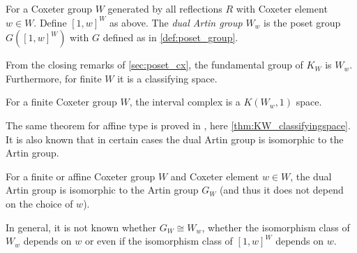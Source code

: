 \documentclass[class=article, crop=false]{standalone}
\begin{document}
\begin{definition}
    For a Coxeter group $W$ generated by all reflections $R$ with Coxeter element $w \in W$. Define $[1,w]^W$ as above. The \emph{dual Artin group} $W_w$ is the poset group $G([1,w]^W)$ with $G$ defined as in \cref{def:poset_group}.
\end{definition}

From the closing remarks of \cref{sec:poset_cx}, the fundamental group of $K_{W}$ is $W_w$. Furthermore, for finite $W$ it is a classifying space.

\begin{theorem}
    For a finite Coxeter group $W$, the interval complex is a $K(W_w,1)$ space.
    \label{thm:interval_cx_k_pi_1_finite}
\end{theorem}

The same theorem for affine type is proved in \cite{paolini_salvetti_kpi1_2021}, here \cref{thm:KW_classifyingspace}. It is also known that in certain cases the dual Artin group is isomorphic to the Artin group.

\begin{theorem}
    For a finite \cite{bessis_dual_2003} or affine \cite{mccammond_sulway_artin_2017} Coxeter group $W$ and Coxeter element $w \in W$, the dual Artin group is isomorphic to the Artin group $G_W$ (and thus it does not depend on the choice of $w$).
    \label{thm:dual_artin_iso_artin}
\end{theorem}

In general, it is not known whether $G_W \cong W_w$, whether the isomorphism class of $W_w$ depends on $w$ or even if the isomorphism class of $[1,w]^W$ depends on $w$.
\end{document}

